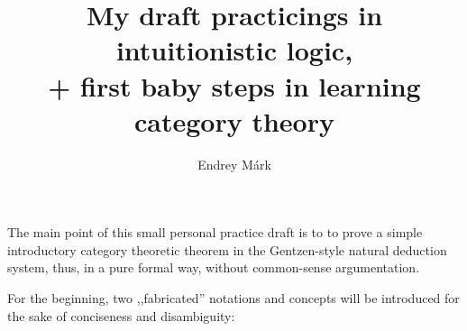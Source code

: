 \documentclass{article}
\title{My draft practicings in intuitionistic logic,\\+ first baby steps in learning category theory}
\author{Endrey Márk}
\theoremstyle{definition}
\begin{document}
	\maketitle
	\begin{comment}
		\[
			\infer[(\lor E)_{a,b}]{C}{
				A\lor B&
				\infer*C{
					\infer[a]A{}
				}&
				\infer*C{
					\infer[b]B{}
				}
			}
		\]
	\end{comment}
	The main point of this small personal practice draft is to to prove a simple introductory category theoretic theorem in the Gentzen-style natural deduction system, thus, in a pure formal way, without common-sense argumentation.

	For the beginning, two ,,fabricated'' notations and concepts will be introduced for the sake of conciseness and disambiguity:
\end{document}
